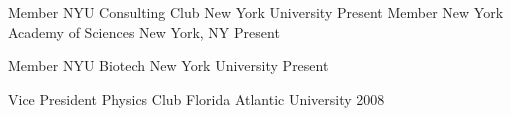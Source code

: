 


\begin{cvhonors}


\cvhonor
{Member} %
{NYU Consulting Club} %
{New York University} %
{Present} %
\cvhonor
{Member} %
{New York Academy of Sciences} %
{New York, NY} %
{Present} %

\cvhonor
{Member} %
{NYU Biotech} %
{New York University} %
{Present} %
    

\cvhonor
{Vice President} %
{Physics Club} %
{Florida Atlantic University} %
{2008} %





\end{cvhonors}
